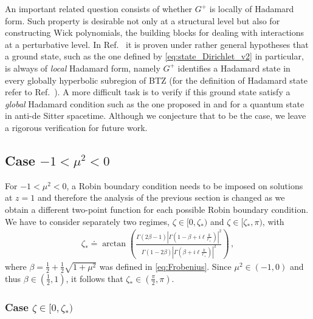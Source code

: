\documentclass[aps, prd, amsmath, floats, floatfix, twocolumn, nofootinbib, superscriptaddress, showpacs]{revtex4-1}
\begin{document}
An important related question consists of whether $G^+$ is
locally of Hadamard form. Such property is desirable not only at a
structural level but also for constructing Wick polynomials, the
building blocks for dealing with interactions at a perturbative level.
In Ref.~\cite{Sahlmann:2000fh} it is proven under rather general
hypotheses that a ground state, such as the one defined by
\eqref{eq:state_Dirichlet_v2} in particular, is always of \emph{local}
Hadamard form, namely $G^+$ identifies a Hadamard state in every
globally hyperbolic subregion of BTZ (for the definition of Hadamard
state refer to Ref.~\cite{Khavkine:2014mta}). A more difficult task is
to verify if this ground state satisfy a \emph{global} Hadamard
condition such as the one proposed in \cite{Dappiaggi:2016fwc} and
\cite{Dappiaggi:2017wvj} for a quantum state in anti-de Sitter
spacetime. Although we conjecture that to be the case, we leave a
rigorous verification for future work.




\subsection{Case $-1<\mu^2<0$}
	
For $-1<\mu^2<0$, a Robin boundary condition needs to be imposed on solutions at $z=1$ and therefore the analysis of the previous section is changed as we obtain a different two-point function for each possible Robin boundary condition. We have to consider separately two regimes, $\zeta\in[0,\zeta_*)$ and $\zeta\in[\zeta_*,\pi)$, with
%
\begin{align} \label{eq:zetacritical}
\zeta_* \doteq \arctan\left( \frac{\Gamma\left(2\beta-1\right)\left|\Gamma\left(1-\beta+i\ell\frac{k}{r_+}\right)\right|^2}{\Gamma\left(1-2\beta\right)\left|\Gamma\left(\beta+i\ell\frac{k}{r_+}\right)\right|^2} \right) \, ,
\end{align}
%
where $\beta = \frac{1}{2}+\frac{1}{2}\sqrt{1+\mu^2}$ was defined in \eqref{eq:Frobenius}. Since $\mu^2 \in (-1,0)$ and thus $\beta \in (\frac{1}{2},1)$, it follows that $\zeta_* \in (\frac{\pi}{2}, \pi)$.




\subsubsection{Case $\zeta\in[0,\zeta_*)$}
\end{document}
